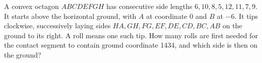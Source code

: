 A convex octagon $ABCDEFGH$ has consecutive side lengths $6,10,8,5,12,11,7,9$. It starts above the horizontal ground, with $A$ at coordinate 0 and $B$ at $-6$. It tips clockwise, successively laying sides $HA,GH,FG,EF,DE,CD,BC,AB$ on the ground to its right. A roll means one such tip. How many rolls are first needed for the contact segment to contain ground coordinate 1434, and which side is then on the ground?
